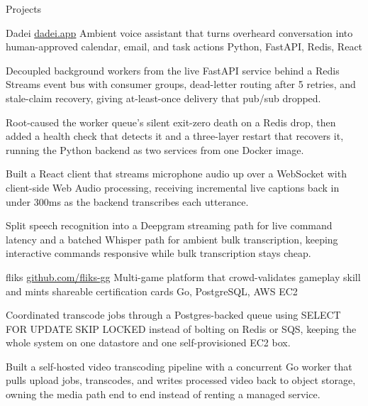 \documentclass[
	11pt
]{../../../template}
\begin{document}
	\begin{rSection}{P}{rojects}
		\begin{rSectionEntry}
			{Dadei}
			{\href{https://dadei.app}{dadei.app}}
			{Ambient voice assistant that turns overheard conversation into human-approved calendar, email, and task actions}
			{Python, FastAPI, Redis, React}
			{}

			\item Decoupled background workers from the live FastAPI service behind a Redis Streams event bus with consumer groups, dead-letter routing after 5 retries, and stale-claim recovery, giving at-least-once delivery that pub/sub dropped.
			\item Root-caused the worker queue's silent exit-zero death on a Redis drop, then added a health check that detects it and a three-layer restart that recovers it, running the Python backend as two services from one Docker image.
			\item Built a React client that streams microphone audio up over a WebSocket with client-side Web Audio processing, receiving incremental live captions back in under 300ms as the backend transcribes each utterance.
			\item Split speech recognition into a Deepgram streaming path for live command latency and a batched Whisper path for ambient bulk transcription, keeping interactive commands responsive while bulk transcription stays cheap.
		\end{rSectionEntry}

		\begin{rSectionEntry}
			{fliks}
			{\href{https://github.com/fliks-gg}{github.com/fliks-gg}}
			{Multi-game platform that crowd-validates gameplay skill and mints shareable certification cards}
			{Go, PostgreSQL, AWS EC2}
			{}

			\item Coordinated transcode jobs through a Postgres-backed queue using SELECT FOR UPDATE SKIP LOCKED instead of bolting on Redis or SQS, keeping the whole system on one datastore and one self-provisioned EC2 box.
			\item Built a self-hosted video transcoding pipeline with a concurrent Go worker that pulls upload jobs, transcodes, and writes processed video back to object storage, owning the media path end to end instead of renting a managed service.
		\end{rSectionEntry}
	\end{rSection}
\end{document}
